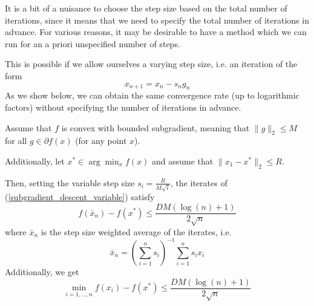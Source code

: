 It is a bit of a nuisance to choose the step size based on the total number of iterations, since it means that
we need to specify the total number of iterations in advance. For various reasons, it may be desirable to have a 
method which we can run for
an a priori unspecified number of steps.

This is possible if we allow ourselves a varying step size, i.e. an iteration
of the form
\begin{equation}\label{subgradient_descent_variable}
 x_{n+1} = x_n - s_ng_n
\end{equation}
As we show below, we can obtain the same convergence rate (up to logarithmic factors) without specifying the
number of iterations in advance.

\begin{theorem}\label{variable_subgradient_descent_thm}
 Assume that $f$ is convex with bounded subgradient, meaning that $\|g\|_2 \leq M$ for all $g\in \partial f(x)$ (for any point $x$).
 
 Additionally, let $x^*\in \arg\min_x f(x)$ and assume that $\|x_1 - x^*\|_2 \leq R$. 
 
 Then, setting the variable step size $s_i = \frac{R}{M\sqrt{i}}$,
 the iterates of (\ref{subgradient_descent_variable}) satisfy
 \begin{equation}
  f(\bar{x}_n) - f(x^*) \leq \frac{DM(\log(n) + 1)}{2\sqrt{n}}
 \end{equation}
 where $\bar{x}_n$ is the step size weighted average of the iterates, i.e.
 \begin{equation}
  \bar{x}_n = \left(\displaystyle\sum_{i = 1}^n s_i\right)^{-1} \displaystyle\sum_{i=1}^n s_ix_i
 \end{equation}
 Additionally, we get
 \begin{equation}
  \min_{i=1,...,n} f(x_i) - f(x^*) \leq \frac{DM(\log(n) + 1)}{2\sqrt{n}}
 \end{equation}

\end{theorem}
